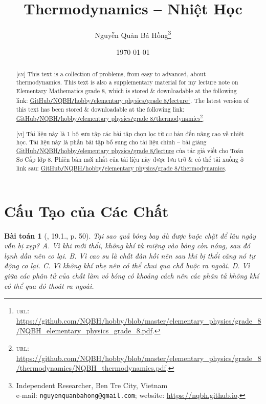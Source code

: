 \documentclass{article}
\title{Thermodynamics -- Nhiệt Học}
\author{Nguyễn Quản Bá Hồng\footnote{Independent Researcher, Ben Tre City, Vietnam\\e-mail: \texttt{nguyenquanbahong@gmail.com}; website: \url{https://nqbh.github.io}.}}
\date{\today}
\newtheorem{baitoan}{Bài toán}
\begin{document}
\maketitle
\begin{abstract}
	\textsc{[en]} This text is a collection of problems, from easy to advanced, about thermodynamics. This text is also a supplementary material for my lecture note on Elementary Mathematics grade 8, which is stored \& downloadable at the following link: \href{https://github.com/NQBH/hobby/blob/master/elementary_physics/grade_8/NQBH_elementary_physics_grade_8.pdf}{GitHub\texttt{/}NQBH\texttt{/}hobby\texttt{/}elementary physics\texttt{/}grade 8\texttt{/}lecture}\footnote{\textsc{url}: \url{https://github.com/NQBH/hobby/blob/master/elementary_physics/grade_8/NQBH_elementary_physics_grade_8.pdf}.}. The latest version of this text has been stored \& downloadable at the following link: \href{https://github.com/NQBH/hobby/blob/master/elementary_physics/grade_8/thermodynamics/NQBH_thermodynamics.pdf}{GitHub\texttt{/}NQBH\texttt{/}hobby\texttt{/}elementary physics\texttt{/}grade 8\texttt{/}thermodynamics}\footnote{\textsc{url}: \url{https://github.com/NQBH/hobby/blob/master/elementary_physics/grade_8/thermodynamics/NQBH_thermodynamics.pdf}.}.
	\vspace{2mm}
	
	\textsc{[vi]} Tài liệu này là 1 bộ sưu tập các bài tập chọn lọc từ cơ bản đến nâng cao về nhiệt học. Tài liệu này là phần bài tập bổ sung cho tài liệu chính -- bài giảng \href{https://github.com/NQBH/hobby/blob/master/elementary_physics/grade_8/NQBH_elementary_physics_grade_8.pdf}{GitHub\texttt{/}NQBH\texttt{/}hobby\texttt{/}elementary physics\texttt{/}grade 8\texttt{/}lecture} của tác giả viết cho Toán Sơ Cấp lớp 8. Phiên bản mới nhất của tài liệu này được lưu trữ \& có thể tải xuống ở link sau: \href{https://github.com/NQBH/hobby/blob/master/elementary_physics/grade_8/thermodynamics/NQBH_thermodynamics.pdf}{GitHub\texttt{/}NQBH\texttt{/}hobby\texttt{/}elementary physics\texttt{/}grade 8\texttt{/}thermodynamics}.
\end{abstract}
\tableofcontents
\newpage


\section{Cấu Tạo của Các Chất}

\begin{baitoan}[\cite{SBT_Vat_Ly_8}, 19.1., p. 50]
	Tại sao quả bóng bay dù được buộc chặt để lâu ngày vẫn bị xẹp? {\sf A.} Vì khi mới thổi, không khí từ miệng vào bóng còn nóng, sau đó lạnh dần nên co lại. {\sf B.} Vì cao su là chất đàn hồi nên sau khi bị thổi căng nó tự động co lại. {\sf C.} Vì không khí nhẹ nên có thể chui qua chỗ buộc ra ngoài. {\sf D.} Vì giữa các phân tử của chất làm vỏ bóng có khoảng cách nên các phân tử không khí có thể qua đó thoát ra ngoài.
\end{baitoan}
\end{document}

